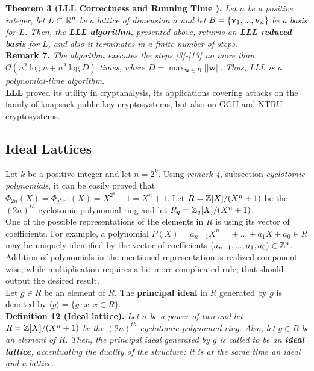\textbf{Theorem 3 (LLL Correctness and Running Time \cite{HPS08}).} \textit{Let $n$ be a positive integer, let $L \subset \mathbb{R}^n$ be a lattice of dimension $n$ and let} $B = \{\textbf{v}_1,...,\textbf{v}_n\}$ \textit{be a basis for $L$. Then, the \textbf{LLL algorithm}, presented above, returns an \textbf{LLL reduced basis} for $L$, and also it terminates in a finite number of steps.}\\

\textbf{Remark 7.} \textit{The algorithm executes the steps [3]-[13] no more than $\mathcal{O}(n^2 \log n + n^2 \log D)$ times, where} $D = \displaystyle{\max_{\textbf{w} \in B} ||\textbf{w}||}$. \textit{Thus, LLL is a polynomial-time algorithm}.\\

\textbf{LLL} proved its utility in cryptanalysis, its applications covering attacks on the family of knapsack public-key cryptosystems, but also on GGH and NTRU cryptosystems. 

\subsection{Ideal Lattices}

Let $k$ be a positive integer and let $n = 2 ^ k$. Using \textit{remark 4}, subsection \textit{cyclotomic polynomials}, it can be easily proved that $\Phi_{2n}(X) = \Phi_{2^{k+1}}(X) = X ^ {2^k} + 1 = X^n + 1$. Let $R = {\mathbb Z}[X] / (X^n + 1)$ be the $(2n)^{th}$ cyclotomic polynomial ring and let $R_q = {\mathbb Z}_q[X] / (X^n + 1)$.\\

One of the possible representations of the elements in $R$ is using its vector of coefficients. For example, a polynomial $P(X) = a_{n-1} X ^{n-1} + ... + a_1X + a_0 \in R$ may be uniquely identified by the vector of coefficients $(a_{n-1}, ..., a_1, a_0) \in {\mathbb Z}^n$. Addition of polynomials in the mentioned representation is realized component-wise, while multiplication requires a bit more complicated rule, that should output the desired result. \\

Let $g\in R$ be an element of $R$. The \textbf{principal ideal} in $R$ generated by $g$ is denoted by $\langle g \rangle = \{g\cdot x : x \in R\}$.\\

\textbf{Definition 12 (Ideal lattice).} \textit{Let $n$ be a power of two and let $R = {\mathbb Z}[X]/(X^n + 1)$ be the $(2n)^{th}$ cyclotomic polynomial ring. Also, let $g \in R$ be an element of $R$. Then, the principal ideal generated by $g$ is called to be an \textbf{ideal lattice}, accentuating the duality of the structure: it is at the same time an \textit{ideal} and a \textit{lattice}.}\\

